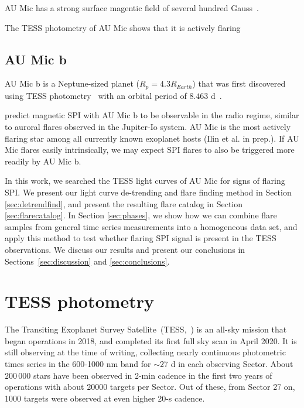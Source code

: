 \documentclass[fleqn,usenatbib,letters]{mnras}%
\begin{document}
AU Mic has a strong surface magentic field of several hundred Gauss~\citep{klein2021}.

The TESS photometry of AU Mic shows that it is actively flaring~\citep{martioli2021}
\subsection{AU Mic b}
AU Mic b is a Neptune-sized planet ($R_p = 4.3R_{Earth}$) that was first discovered using TESS photometry~\citep{plavchan2020} with an orbital period of $8.463$ d~\citep{plavchan2020,martioli2021}.



\citet{kavanagh2021} predict magnetic SPI with AU Mic b to be observable in the radio regime, similar to auroral flares observed in the Jupiter-Io system. AU Mic is the most actively flaring star among all currently known exoplanet hosts (Ilin et al. in prep.). If AU Mic flares easily intrinsically, we may expect SPI flares to also be triggered more readily by AU Mic b. 

In this work, we searched the TESS light curves of AU Mic for signs of flaring SPI. We present our light curve de-trending and flare finding method in Section \ref{sec:detrendfind}, and present the resulting flare catalog in Section \ref{sec:flarecatalog}. In Section \ref{sec:phases}, we show how we can combine flare samples from general time series measurements into a homogeneous data set, and apply this method to test whether flaring SPI signal is present in the TESS observations. We discuss our results and present our conclusions in Sections~\ref{sec:discussion} and \ref{sec:conclusions}.


\section{TESS photometry}
The Transiting Exoplanet Survey Satellite~(TESS,~\citealt{ricker2014}) is an all-sky mission that began operations in 2018, and completed its first full sky scan in April 2020. It is still observing at the time of writing, collecting nearly continuous photometric times series in the 600-1000 nm band for $\sim 27$ d in each observing Sector. About $200\,000$ stars have been observed in 2-min cadence in the first two years of operations with about 20000 targets per Sector. Out of these, from Sector 27 on, 1000 targets were observed at even higher 20-s cadence.
\end{document}

